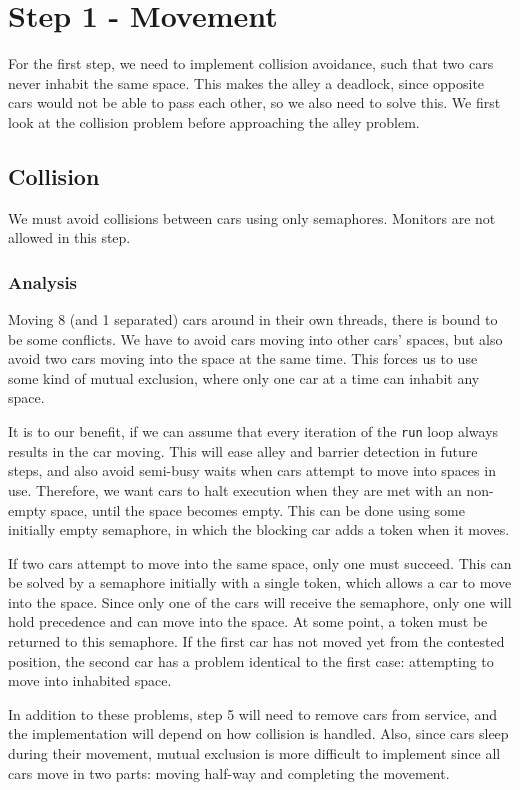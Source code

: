 \section*{Step 1 - Movement}
For the first step, we need to implement collision avoidance, such that two cars never inhabit the same space. This makes the alley a deadlock, since opposite cars would not be able to pass each other, so we also need to solve this. We first look at the collision problem before approaching the alley problem.

\subsection*{Collision}
We must avoid collisions between cars using only semaphores. Monitors are not allowed in this step.

\subsubsection*{Analysis}
Moving 8 (and 1 separated) cars around in their own threads, there is bound to be some conflicts. We have to avoid cars moving into other cars' spaces, but also avoid two cars moving into the space at the same time. This forces us to use some kind of mutual exclusion, where only one car at a time can inhabit any space.

It is to our benefit, if we can assume that every iteration of the \texttt{run} loop always results in the car moving. This will ease alley and barrier detection in future steps, and also avoid semi-busy waits when cars attempt to move into spaces in use. Therefore, we want cars to halt execution when they are met with an non-empty space, until the space becomes empty. This can be done using some initially empty semaphore, in which the blocking car adds a token when it moves.

If two cars attempt to move into the same space, only one must succeed. This can be solved by a semaphore initially with a single token, which allows a car to move into the space. Since only one of the cars will receive the semaphore, only one will hold precedence and can move into the space. At some point, a token must be returned to this semaphore. If the first car has not moved yet from the contested position, the second car has a problem identical to the first case: attempting to move into inhabited space.

In addition to these problems, step 5 will need to remove cars from service, and the implementation will depend on how collision is handled. Also, since cars sleep during their movement, mutual exclusion is more difficult to implement since all cars move in two parts: moving half-way and completing the movement.

